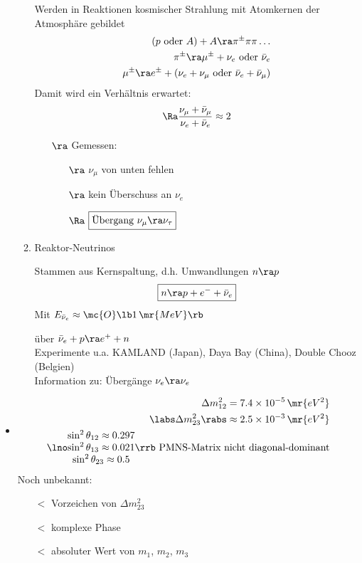 \begin{itemize}
\begin{enumerate}
Werden in Reaktionen kosmischer Strahlung mit Atomkernen der Atmosphäre gebildet
\begin{align}
\begin{split}
(p \text{ oder } A) +A \ra \pi^\pm \pi \pi \dots\\
\pi^\pm \ra \mu^\pm + \nu_e \text{ oder } \bar{\nu}_e\\
\mu^\pm \ra e^\pm + (\nu_e + \nu_\mu \text{ oder } \bar{\nu}_e + \bar{\nu}_\mu)
\end{split}
\end{align}
Damit wird ein Verhältnis erwartet:
\begin{align}
\Ra \frac{\nu_\mu + \bar{\nu}_\mu}{\nu_e + \bar{\nu}_e} \approx 2
\end{align}
\begin{itemize}
\item[$\ra$] Gemessen:
\begin{itemize}
\item[$\ra$] $\nu_\mu$ \glqq von unten\grqq{} fehlen
\item[$\ra$] kein Überschuss an $\nu_e$
\item[$\Ra$] $\boxed{\text{Übergang } \nu_\mu \ra \nu_\tau}$
\end{itemize}
\end{itemize}
\item Reaktor-Neutrinos

Stammen aus Kernspaltung, d.h. Umwandlungen $n\ra p$
\begin{align}
\boxed{n \ra p + e^- + \bar{\nu}_e}
\end{align}
Mit $E_{\bar{\nu}_e}\approx \mc{O}\lb 1\,\mr{MeV}\rb $

 über $\bar{\nu}_e + p \ra e^+ + n$\\
Experimente u.a. KAMLAND (Japan), Daya Bay (China), Double Chooz (Belgien)\\
Information zu: Übergänge $\nu_e \ra \nu_e$
\end{enumerate}
\item {}
\begin{align}
\Delta m_{12}^2 = 7.4\times 10^{-5}\,\mr{eV^2}\\
\labs \Delta m_{23}^2\rabs \approx 2.5\times 10^{-3}\,\mr{eV^2}\\
\lno \begin{matrix}
\sin^2 \theta_{12} \approx 0.297\\ \sin^2 \theta_{13} \approx 0.021 \\ \sin^2 \theta_{23} \approx 0.5
\end{matrix}\rrb \text{ PMNS-Matrix nicht diagonal-dominant}
\end{align}
Noch unbekannt:
\begin{itemize}
\item[$\lt$] Vorzeichen von $\Delta m_{23}^2$
\item[$\lt$] komplexe Phase
\item[$\lt$] absoluter Wert von $m_1$, $m_2$, $m_3$
\end{itemize}
\newpage


\end{itemize}

